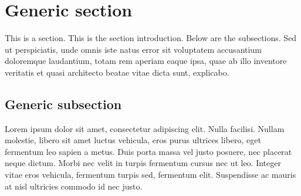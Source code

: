 \documentclass[letterpaper,11pt,leqno]{article}
\newcommand{\bib}{bibliography.bib}
\begin{document}
\section{Generic section}\label{s:section}

This is a section. This is the section introduction. Below are the subsections. Sed ut perspiciatis, unde omnis iste natus error sit voluptatem accusantium doloremque laudantium, totam rem aperiam eaque ipsa, quae ab illo inventore veritatis et quasi architecto beatae vitae dicta sunt, explicabo. 

\subsection{Generic subsection}

Lorem ipsum dolor sit amet, consectetur adipiscing elit. Nulla facilisi. Nullam molestie, libero sit amet luctus vehicula, eros purus ultrices libero, eget fermentum leo sapien a metus. Duis porta massa vel justo posuere, nec placerat neque dictum. Morbi nec velit in turpis fermentum cursus nec ut leo. Integer vitae eros vehicula, fermentum turpis sed, fermentum elit. Suspendisse ac mauris at nisl ultricies commodo id nec justo. 

\pagebreak


\end{document}
